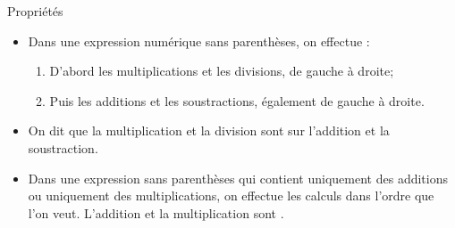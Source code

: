 \documentclass[xcolor={dvipsnames}]{beamer}
\newcommand{\myitem}{\item[\textbullet]}
\begin{document}
\begin{frame}{}
	\begin{alertblock}{Propriétés}
		\begin{itemize}\pause
			
			\myitem Dans une expression numérique sans parenthèses, on effectue :
			\begin{enumerate}
				\item D'abord les multiplications et les divisions, de gauche à droite;
				\item Puis les additions et les soustractions, également de gauche à droite.
			\end{enumerate}\pause
			
			\myitem On dit que la multiplication et la division sont  sur l'addition et la soustraction. \pause
			
			\myitem Dans une expression sans parenthèses qui contient uniquement des additions ou uniquement des multiplications, on effectue les calculs dans l'ordre que l'on veut. L'addition et la multiplication sont .\pause
			
		\end{itemize}
	\end{alertblock}
\end{frame}
\end{document}
